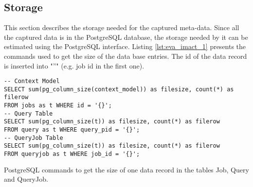 \documentclass[draft,final]{vutinfth} %
\begin{document}
\subsection*{Storage}\label{Evaluation:impact_stor}
This section describes the storage needed for the captured meta-data. Since all the captured data is in the PostgreSQL database, the storage needed by it can be estimated using the PostgreSQL interface. Listing \ref{lst:eva_imact_1} presents the commands used to get the size of the data base entries. The id of the data record is inserted into "''" (e.g. job id in the first one).  

\begin{listing}[ht]
	\begin{verbatim}
-- Context Model 
SELECT sum(pg_column_size(context_model)) as filesize, count(*) as filerow 
FROM jobs as t WHERE id = '{}';
-- Query Table
SELECT sum(pg_column_size(t)) as filesize, count(*) as filerow 
FROM query as t WHERE query_pid = '{}';
-- QueryJob Table
SELECT sum(pg_column_size(t)) as filesize, count(*) as filerow 
FROM queryjob as t WHERE job_id = '{}';
	\end{verbatim}
	\caption{PostgreSQL commands to get the size of one data record in the tables Job, Query and QueryJob.}
	\label{lst:eva_imact_1}
\end{listing}	

		
\end{document}
